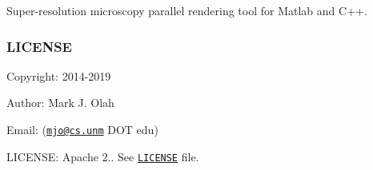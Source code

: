 Super-\/resolution microscopy parallel rendering tool for Matlab and C++.

\subsubsection*{L\+I\+C\+E\+N\+SE}


\begin{DoxyItemize}
\item Copyright\+: 2014-\/2019
\item Author\+: Mark J. Olah
\item Email\+: (\href{mailto:mjo@cs.unm}{\tt mjo@cs.\+unm} D\+OT edu)
\item L\+I\+C\+E\+N\+SE\+: Apache 2.. See \href{https://github.com/markjolah/Tracker/blob/master/LICENSE}{\tt L\+I\+C\+E\+N\+SE} file. 
\end{DoxyItemize}